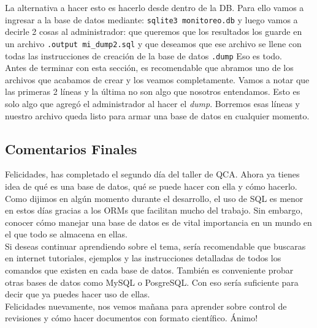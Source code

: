 \documentclass[10pt,letterpaper]{article}
\newcommand{\inlinecode}[1]{
\colorbox{light-gray}{\texttt{#1}}
}
\begin{document}
La alternativa a hacer esto es hacerlo desde dentro de la DB. Para ello vamos a ingresar a la base de datos mediante: \inlinecode{sqlite3 monitoreo.db} y luego vamos a decirle 2 cosas al administrador: que queremos que los resultados los guarde en un archivo \inlinecode{.output mi\_dump2.sql} y que deseamos que ese archivo se llene con todas las instrucciones de creaci\'on de la base de datos \inlinecode{.dump} Eso es todo.\\

Antes de terminar con esta secci\'on, es recomendable que abramos uno de los archivos que acabamos de crear y los veamos completamente. Vamos a notar que las primeras 2 l\'ineas y la \'ultima no son algo que nosotros entendamos. Esto es solo algo que agreg\'o el administrador al hacer el \emph{dump}. Borremos esas l\'ineas y nuestro archivo queda listo para armar una base de datos en cualquier momento.

\subsection{Comentarios Finales}
Felicidades, has completado el segundo d\'ia del taller de QCA. Ahora ya tienes idea de qu\'e es una base de datos, qu\'e se puede hacer con ella y c\'omo hacerlo. Como dijimos en alg\'un momento durante el desarrollo, el uso de SQL es menor en estos d\'ias gracias a los ORMs que facilitan mucho del trabajo. Sin embargo, conocer c\'omo manejar una base de datos es de vital importancia en un mundo en el que todo se almacena en ellas.\\

Si deseas continuar aprendiendo sobre el tema, ser\'ia recomendable que buscaras en internet tutoriales, ejemplos y las instrucciones detalladas de todos los comandos que existen en cada base de datos. Tambi\'en es conveniente probar otras bases de datos como MySQL o PosgreSQL. Con eso ser\'ia suficiente para decir que ya puedes hacer uso de ellas.\\

Felicidades nuevamente, nos vemos ma\~nana para aprender sobre control de revisiones y c\'omo hacer documentos con formato cient\'ifico. \'Animo!
\end{document}
